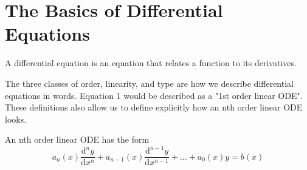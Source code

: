 \chapter{The Basics of Differential Equations}
\noindent
A differential equation is an equation that relates a function to its derivatives.



\noindent
The three classes of order, linearity, and type are how we describe differential equations in words. Equation 1 would be described as a "1st order linear ODE". These definitions also allow us to define explicitly how an nth order linear ODE looks.


\begin{definition}
	An nth order linear ODE has the form
	\begin{equation*}
	a_n(x)\frac{\mathrm{d}^n y}{\mathrm{d} x^n} + a_{n-1}(x)\frac{\mathrm{d}^{n-1} y}{\mathrm{d} x^{n-1}} + \ldots + a_0(x)y = b(x)
	\end{equation*}
\end{definition}



